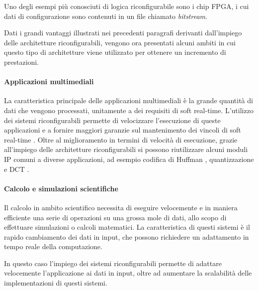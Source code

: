 Uno degli esempi pi\`u conosciuti di logica riconfigurabile sono i chip \ac{FPGA}, i cui dati di
configurazione sono contenuti in un file chiamato \emph{bitstream}.


Dati i grandi vantaggi illustrati nei precedenti paragrafi derivanti dall'impiego delle
architetture riconfigurabili, vengono ora presentati alcuni ambiti in cui questo tipo
di architetture viene utilizzato per ottenere un incremento di prestazioni.

\paragraph{Applicazioni multimediali}
La caratteristica principale delle applicazioni multimediali è la grande quantità di dati che
vengono processati, unitamente a dei requisiti di soft real-time. L'utilizzo dei sistemi
riconfigurabili permette di velocizzare l'esecuzione di queste applicazioni e a fornire maggiori garanzie
sul mantenimento dei vincoli di soft real-time \cite{ReconfigurableSystemDesignVerification}. Oltre al miglioramento
in termini di velocità di esecuzione, grazie all'impiego delle architetture riconfigurabili si possono
riutilizzare alcuni moduli \ac{IP} comuni a diverse applicazioni, ad esempio codifica di
Huffman \cite{HuffmanFPGA}, quantizzazione e \ac{DCT} \cite{DCTImplementation}.

\paragraph{Calcolo e simulazioni scientifiche}
Il calcolo in ambito scientifico necessita di eseguire velocemente e in maniera efficiente
una serie di operazioni su una grossa mole di dati, allo scopo di effettuare simulazioni o
calcoli matematici. La caratteristica di questi sistemi è il rapido cambiamento dei dati in
input, che possono richiedere un adattamento in tempo reale della computazione.

In questo caso l'impiego dei sistemi riconfigurabili permette di adattare velocemente
l'applicazione ai dati in input, oltre ad aumentare la scalabilità delle implementazioni
di questi sistemi.


